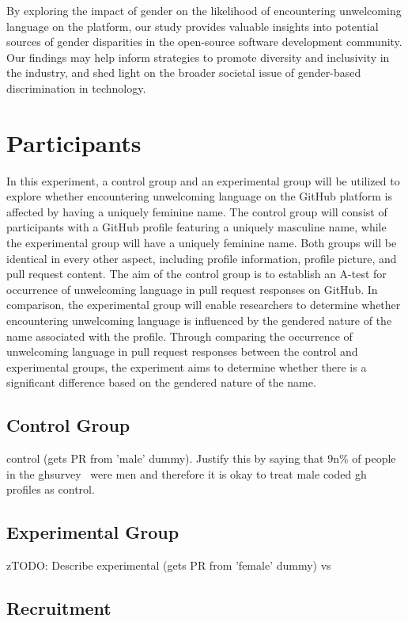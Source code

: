 \documentclass[journal,12pt,onecolumn,]{IEEEtran}
\begin{document}
By exploring the impact of gender on the likelihood of encountering unwelcoming language on the platform, our study provides valuable insights into potential sources of gender disparities in the open-source software development community. Our findings may help inform strategies to promote diversity and inclusivity in the industry, and shed light on the broader societal issue of gender-based discrimination in technology.


\section{Participants}
In this experiment, a control group and an experimental group will be utilized to explore whether encountering unwelcoming language on the GitHub platform is affected by having a uniquely feminine name. The control group will consist of participants with a GitHub profile featuring a uniquely masculine name, while the experimental group will have a uniquely feminine name. Both groups will be identical in every other aspect, including profile information, profile picture, and pull request content. The aim of the control group is to establish an A-test for occurrence of unwelcoming language in pull request responses on GitHub. In comparison, the experimental group will enable researchers to determine whether encountering unwelcoming language is influenced by the gendered nature of the name associated with the profile. Through comparing the occurrence of unwelcoming language in pull request responses between the control and experimental groups, the experiment aims to determine whether there is a significant difference based on the gendered nature of the name.
\subsection{Control Group}
control (gets PR from 'male' dummy). Justify this by saying that 9n\% of people in the ghsurvey~\cite{gitHubOpenSourceSurvey2017} were men and therefore it is okay to treat male coded gh profiles as control.

\subsection{Experimental Group}
zTODO: Describe experimental (gets PR from 'female' dummy) vs

\subsection{Recruitment}
\end{document}

